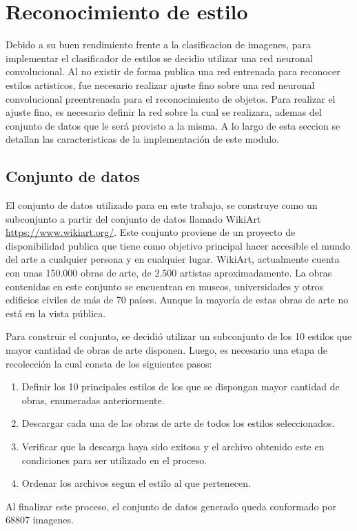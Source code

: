 \documentclass[a4paper,11pt,spanish]{book}
\begin{document}
\section{Reconocimiento de estilo}
  Debido a su buen rendimiento frente a la clasificacion de imagenes, para implementar el clasificador de estilos se decidio utilizar una red neuronal convolucional.
  Al no existir de forma publica una red entrenada para reconocer estilos artisticos, fue necesario realizar ajuste fino sobre una red neuronal convolucional preentrenada para el reconocimiento de objetos.
  Para realizar el ajuste fino, es necesario definir la red sobre la cual se realizara, ademas del conjunto de datos que le será provisto a la misma.
  A lo largo de esta seccion se detallan las caracteristicas de la implementación de este modulo.
  
  \subsection{Conjunto de datos}
    El conjunto de datos utilizado para en este trabajo, se construye como un subconjunto a partir del conjunto de datos llamado WikiArt \url{https://www.wikiart.org/}.
    Este conjunto proviene de un proyecto de disponibilidad publica que tiene como objetivo principal hacer accesible el mundo del arte a cualquier persona y en cualquier lugar.
    WikiArt, actualmente cuenta con unas 150.000 obras de arte, de 2.500 artistas aproximadamente. 
    La obras contenidas en este conjunto se encuentran en museos, universidades y otros edificios civiles de más de 70 países. Aunque la mayoría de estas obras de arte no está en la vista pública.
    
    Para construir el conjunto, se decidió utilizar un subconjunto de los 10 estilos que mayor cantidad de obras de arte disponen. 
    Luego, es necesario una etapa de recolección la cual consta de los siguientes pasos:
    \begin{enumerate}
      \item Definir los 10 principales estilos de los que se dispongan mayor cantidad de obras, enumeradas anteriormente.
      \item Descargar cada una de las obras de arte de todos los estilos seleccionados.
      \item Verificar que la descarga haya sido exitosa y el archivo obtenido este en condiciones para ser utilizado en el proceso.
      \item Ordenar los archivos segun el estilo al que pertenecen.
    \end{enumerate}
    Al finalizar este proceso, el conjunto de datos generado queda conformado por 68807 imagenes.
    
\end{document}
